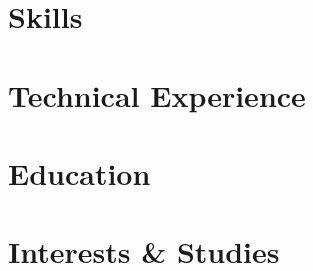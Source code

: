 \documentclass[letter,14pt]{article}
\begin{document}


\section{Skills}


\section{Technical Experience}


\section{Education}


\section{Interests \& Studies}

\end{document}
